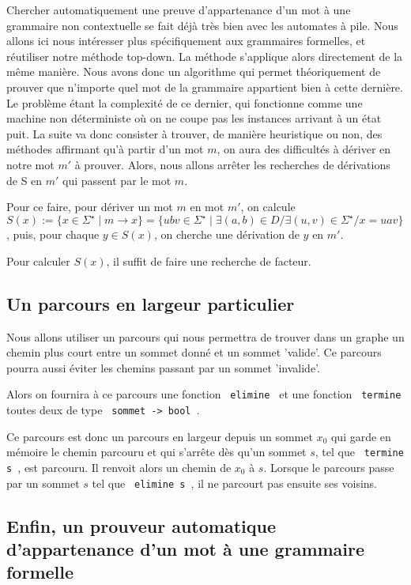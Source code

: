 \documentclass[a4paper,12pt]{article}
\begin{document}
Chercher automatiquement une preuve d'appartenance d'un mot à une grammaire non contextuelle se fait déjà très bien avec les automates à pile.
Nous allons ici nous intéresser plus spécifiquement aux grammaires formelles, et réutiliser notre méthode top-down.
La méthode s'applique alors directement de la même manière.
Nous avons donc un algorithme qui permet théoriquement de prouver que n'importe quel mot de la grammaire appartient bien à cette dernière.
Le problème étant la complexité de ce dernier, qui fonctionne comme une machine non déterministe où on ne coupe pas les instances arrivant à un état puit.
La suite va donc consister à trouver, de manière heuristique ou non, des méthodes affirmant qu'à partir d'un mot $m$, on aura des difficultés à dériver en notre mot $m'$ à prouver.
Alors, nous allons arrêter les recherches de dérivations de S en $m'$ qui passent par le mot $m$.

Pour ce faire, pour dériver un mot $m$ en mot $m'$, on calcule $S(x) := \{x \in \Sigma^\star \mid m \rightarrow x\} 
=\{ubv \in \Sigma^\star \mid \exists (a,b) \in D / \exists (u,v)\in \Sigma^\star / x = uav\}$,
puis, pour chaque $ y \in S(x)$, on cherche une dérivation de $y$ en $m'$.

Pour calculer $S(x)$, il suffit de faire une recherche de facteur.






\subsection{Un parcours en largeur particulier}
Nous allons utiliser un parcours qui nous permettra de trouver dans un graphe un chemin plus court entre un sommet donné et un sommet 'valide'.
Ce parcours pourra aussi éviter les chemins passant par un sommet 'invalide'.

Alors on fournira à ce parcours une fonction \texttt{ elimine } et une fonction \texttt{ termine } toutes deux de type \texttt{ sommet -> bool }.

Ce parcours est donc un parcours en largeur depuis un sommet $x_0$ qui garde en mémoire le chemin parcouru et qui s'arrête dès qu'un 
sommet $s$, tel que \texttt{ termine s }, est parcouru. Il renvoit alors un chemin de $x_0$ à $s$. Lorsque le parcours passe par un sommet $s$ tel que \texttt{ elimine s }, 
il ne parcourt pas ensuite ses voisins.



\subsection{Enfin, un prouveur automatique d'appartenance d'un mot à une grammaire formelle}
\end{document}
